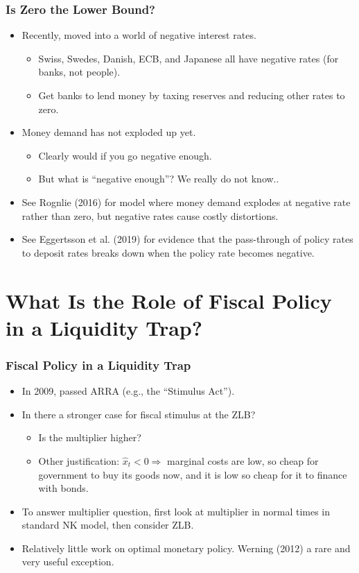 \documentclass[english,xcolor=svgnames]{beamer}
\begin{document}
\begin{frame}
\frametitle{Is Zero the Lower Bound?}

\begin{itemize}
\item Recently, moved into a world of negative interest rates.
	\begin{itemize}
		\item Swiss, Swedes, Danish, ECB, and Japanese all have negative rates (for banks, not people).
	\item Get banks to lend money by taxing reserves and reducing other rates to zero.
	\end{itemize}
	\item Money demand has not exploded up yet.
	\begin{itemize}
		\item Clearly would if you go negative enough.
		\item But what is ``negative enough''? We really do not know..
	\end{itemize}
	\item See Rognlie (2016) for model where money demand explodes at negative rate rather than zero, but negative rates cause costly distortions.
	\item See Eggertsson et al. (2019) for evidence that the pass-through of policy rates to deposit rates breaks down when the policy rate becomes negative.
\end{itemize}	
\end{frame}


\section{What Is the Role of Fiscal Policy in a Liquidity Trap?}

\begin{frame}
\frametitle{Fiscal Policy in a Liquidity Trap}

\begin{itemize}
\item In 2009, passed ARRA (e.g., the ``Stimulus Act'').
\item In there a stronger case for fiscal stimulus at the ZLB?
	\begin{itemize}
		\item Is the multiplier higher?
		\item Other justification: $\hat{x}_t<0\Rightarrow$ marginal costs are low, so cheap for government to buy its goods now, and it is low so cheap for it to finance with bonds.
	\end{itemize}
	\item To answer multiplier question, first look at multiplier in normal times in standard NK model, then consider ZLB.
	\item Relatively little work on optimal monetary policy. Werning (2012) a rare and very useful exception.
\end{itemize}	
\end{frame}
\end{document}
